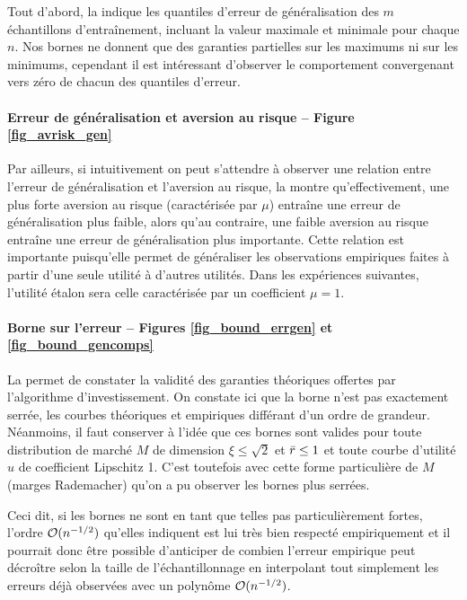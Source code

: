 Tout d'abord, la  indique les quantiles d'erreur de généralisation
des $m$ échantillons d'entraînement, incluant la valeur maximale et minimale pour chaque
$n$. Nos bornes ne donnent que des garanties partielles sur les maximums ni sur les
minimums, cependant il est intéressant d'observer le comportement convergenant vers zéro
de chacun des quantiles d'erreur. 

\paragraph{Erreur de généralisation et aversion au risque -- Figure \ref{fig_avrisk_gen}}

Par ailleurs, si intuitivement on peut s'attendre à observer une relation entre l'erreur
de généralisation et l'aversion au risque, la  montre
qu'effectivement, une plus forte aversion au risque (caractérisée par $\mu$) entraîne une
erreur de généralisation plus faible, alors qu'au contraire, une faible aversion au risque
entraîne une erreur de généralisation plus importante. Cette relation est importante
puisqu'elle permet de généraliser les observations empiriques faites à partir d'une seule
utilité à d'autres utilités. Dans les expériences suivantes, l'utilité étalon sera celle
caractérisée par un coefficient $\mu=1$.

\paragraph{Borne sur l'erreur -- Figures \ref{fig_bound_errgen} et \ref{fig_bound_gencomps}}

La  permet de constater la validité des garanties théoriques
offertes par l'algorithme d'investissement. On constate ici que la borne n'est pas
exactement serrée, les courbes théoriques et empiriques différant d'un ordre de
grandeur. Néanmoins, il faut conserver à l'idée que ces bornes sont valides pour toute
distribution de marché $M$ de dimension $\xi\leq\sqrt{2}$ et $\bar r\leq 1$ et toute courbe
d'utilité $u$ de coefficient Lipschitz 1. C'est toutefois avec cette forme particulière de
$M$ (marges Rademacher) qu'on a pu observer les bornes plus serrées. 

Ceci dit, si les bornes ne sont en tant que telles pas particulièrement fortes, l'ordre
$\mathcal O(n^{-1/2})$ qu'elles indiquent est lui très bien respecté empiriquement et il pourrait
donc être possible d'anticiper de combien l'erreur empirique peut décroître selon la
taille de l'échantillonnage en interpolant tout simplement les erreurs déjà
observées avec un polynôme $\mathcal O(n^{-1/2})$. 

